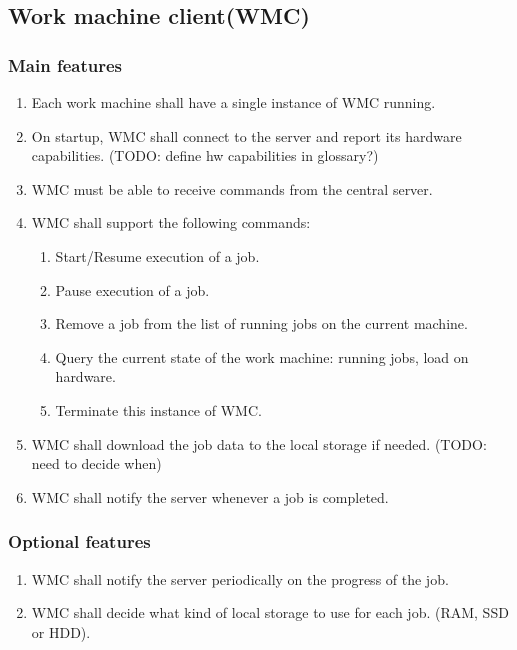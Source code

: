 \subsection{Work machine client(WMC)}
\subsubsection{Main features}
\begin{enumerate}
  \item Each work machine shall have a single instance of WMC running.
  \item On startup, WMC shall connect to the server and report its hardware capabilities. (TODO: define hw capabilities in glossary?)
  \item WMC must be able to receive commands from the central server.
  \item WMC shall support the following commands:
  \begin{enumerate}
    \item Start/Resume execution of a job.
    \item Pause execution of a job.
    \item Remove a job from the list of running jobs on the current machine.
    \item Query the current state of the work machine: running jobs, load on hardware.
    \item Terminate this instance of WMC.
  \end{enumerate}
  \item WMC shall download the job data to the local storage if needed. (TODO: need to decide when)
  \item WMC shall notify the server whenever a job is completed.
\end{enumerate}
\subsubsection{Optional features}
  \begin{enumerate}
    \item WMC shall notify the server periodically on the progress of the job.
    \item WMC shall decide what kind of local storage to use for each job. (RAM, SSD or HDD).
  \end{enumerate}
